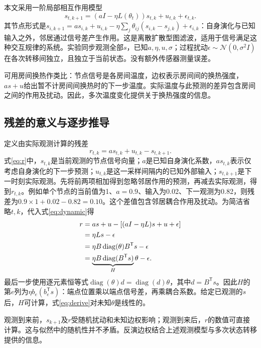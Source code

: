 \documentclass[journal]{IEEEtran}
\newcommand{\T}{\mathsf T}
\begin{document}
本文采用一阶局部相互作用模型
\begin{equation}
 s_{t,k+1}=(aI-\eta L(\theta_t))s_{t,k}+u_{t,k}+\epsilon_{t,k}.\label{eq:dynamic}
\end{equation}
其节点形式是$s_{i,k+1}=a s_{i,k}+u_{i,k}-\eta\sum_j\theta_{ij}(s_{i,k}-s_{j,k})+\epsilon_{i,k}$：自身演化与已知输入之外，邻居通过信号差产生作用。这是离散扩散型图滤波\cite{shuman}，适用于信号满足这种交互规律的系统。实验同步观测全部$s$，已知$a,\eta,u,\sigma$；过程扰动$\epsilon\sim\mathcal N(0,\sigma^2I)$在各次转移间独立，且独立于当前状态。没有额外传感器测量误差。

可用房间换热作类比：节点信号是各房间温度，边权表示房间间的换热强度，$as+u$给出暂不计房间间换热时的下一步温度。实际温度与此预测的差异包含房间之间的作用及扰动。因此，多次温度变化提供关于换热强度的信息。

\subsection{残差的意义与逐步推导}
定义由实际观测计算的残差
\begin{equation}
 r_{t,k}=a s_{t,k}+u_{t,k}-s_{t,k+1}.\label{eq:r}
\end{equation}
式\eqref{eq:r}中，$s_{t,k}$是当前观测的节点信号向量；$a$是已知自身演化系数，$as_{t,k}$表示仅考虑自身演化的下一步预测；$u_{t,k}$是这一采样间隔内的已知外部输入；$s_{t,k+1}$是下一时刻实际观测。先将前两项相加得到忽略邻居作用的预测，再减去实际观测，得到$r_{t,k}$。例如单个节点的当前值为1、$a=0.9$、输入为0.02、下一观测为0.82，则残差为$0.9\times1+0.02-0.82=0.10$。这个差值包含邻居耦合作用及扰动。为简洁省略$t,k$，代入式\eqref{eq:dynamic}得
\begin{align}
r&=as+u-[(aI-\eta L)s+u+\epsilon]\notag\\
 &=\eta Ls-\epsilon\notag\\
 &=\eta B\operatorname{diag}(\theta)B^\T s-\epsilon\notag\\
 &=\underbrace{\eta B\operatorname{diag}(B^\T s)}_{H}\theta-\epsilon.\label{eq:derive}
\end{align}
最后一步使用逐元素恒等式$\operatorname{diag}(\theta)d=\operatorname{diag}(d)\theta$，其中$d=B^\T s$。因此$H$的第$e$列为$\eta b_e(b_e^\T s)$：端点位置乘以端点信号差，再乘耦合系数。给定已观测的$s$后，$H$可计算，式\eqref{eq:derive}对未知$\theta$是线性的。

观测到来前，$s_{k+1}$及$r$受随机扰动和未知边权影响；观测到来后，$r$的数值可直接计算。这与似然中的随机性并不矛盾。反演边权结合上述观测模型与多次状态转移提供的信息。
\end{document}
